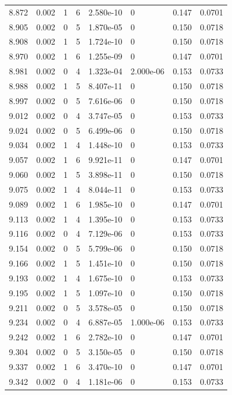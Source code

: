 \documentclass[preview]{standalone}
\begin{document}
{{{{{{{{\begin{tabular}{L{1.2cm}C{1.2cm} C{0.3cm}C{0.5cm} C{1.4cm}C{1.4cm} C{1.4cm}C{1.4cm}}
  8.872  &  0.002  & 1     &  6 &  2.580e-10  & 0  & 0.147 &  0.0701   \\ 
  8.905  &  0.002  & 0     &  5 &  1.870e-05  & 0  & 0.150 &  0.0718   \\ 
  8.908  &  0.002  & 1     &  5 &  1.724e-10  & 0  & 0.150 &  0.0718   \\ 
  8.970  &  0.002  & 1     &  6 &  1.255e-09  & 0  & 0.147 &  0.0701   \\ 
  8.981  &  0.002  & 0     &  4 &  1.323e-04  & 2.000e-06  & 0.153 &  0.0733   \\ 
  8.988  &  0.002  & 1     &  5 &  8.407e-11  & 0  & 0.150 &  0.0718   \\ 
  8.997  &  0.002  & 0     &  5 &  7.616e-06  & 0  & 0.150 &  0.0718   \\ 
  9.012  &  0.002  & 0     &  4 &  3.747e-05  & 0  & 0.153 &  0.0733   \\ 
  9.024  &  0.002  & 0     &  5 &  6.499e-06  & 0  & 0.150 &  0.0718   \\ 
  9.034  &  0.002  & 1     &  4 &  1.448e-10  & 0  & 0.153 &  0.0733   \\ 
  9.057  &  0.002  & 1     &  6 &  9.921e-11  & 0  & 0.147 &  0.0701   \\ 
  9.060  &  0.002  & 1     &  5 &  3.898e-11  & 0  & 0.150 &  0.0718   \\ 
  9.075  &  0.002  & 1     &  4 &  8.044e-11  & 0  & 0.153 &  0.0733   \\ 
  9.089  &  0.002  & 1     &  6 &  1.985e-10  & 0  & 0.147 &  0.0701   \\ 
  9.113  &  0.002  & 1     &  4 &  1.395e-10  & 0  & 0.153 &  0.0733   \\ 
  9.116  &  0.002  & 0     &  4 &  7.129e-06  & 0  & 0.153 &  0.0733   \\ 
  9.154  &  0.002  & 0     &  5 &  5.799e-06  & 0  & 0.150 &  0.0718   \\ 
  9.166  &  0.002  & 1     &  5 &  1.451e-10  & 0  & 0.150 &  0.0718   \\ 
  9.193  &  0.002  & 1     &  4 &  1.675e-10  & 0  & 0.153 &  0.0733   \\ 
  9.195  &  0.002  & 1     &  5 &  1.097e-10  & 0  & 0.150 &  0.0718   \\ 
  9.211  &  0.002  & 0     &  5 &  3.578e-05  & 0  & 0.150 &  0.0718   \\ 
  9.234  &  0.002  & 0     &  4 &  6.887e-05  & 1.000e-06  & 0.153 &  0.0733   \\ 
  9.242  &  0.002  & 1     &  6 &  2.782e-10  & 0  & 0.147 &  0.0701   \\ 
  9.304  &  0.002  & 0     &  5 &  3.150e-05  & 0  & 0.150 &  0.0718   \\ 
  9.337  &  0.002  & 1     &  6 &  3.470e-10  & 0  & 0.147 &  0.0701   \\ 
  9.342  &  0.002  & 0     &  4 &  1.181e-06  & 0  & 0.153 &  0.0733   \\ 
\hline 
\end{tabular} 

}}}}}}}}
\end{document}
